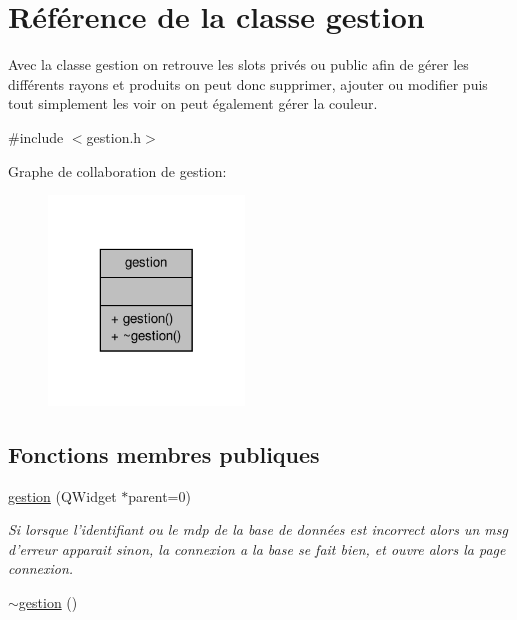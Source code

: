 \hypertarget{classgestion}{\section{Référence de la classe gestion}
\label{classgestion}
}


Avec la classe gestion on retrouve les slots privés ou public afin de gérer les différents rayons et produits on peut donc supprimer, ajouter ou modifier puis tout simplement les voir on peut également gérer la couleur.  




{\ttfamily \#include $<$gestion.\-h$>$}



Graphe de collaboration de gestion\-:\nopagebreak
\begin{figure}[H]
\begin{center}
\leavevmode
\includegraphics[width=148pt]{classgestion__coll__graph}
\end{center}
\end{figure}
\subsection*{Fonctions membres publiques}
\begin{DoxyCompactItemize}
\item 
\hyperlink{classgestion_a56a870ef0bef1cb98c679a1fa4bb25ff}{gestion} (Q\-Widget $\ast$parent=0)
\begin{DoxyCompactList}\small\item\em Si lorsque l'identifiant ou le mdp de la base de données est incorrect alors un msg d'erreur apparait sinon, la connexion a la base se fait bien, et ouvre alors la page connexion. \end{DoxyCompactList}\item 
\hyperlink{classgestion_a56c8770c7068cf05c9363b632f960838}{$\sim$gestion} ()
\end{DoxyCompactItemize}


